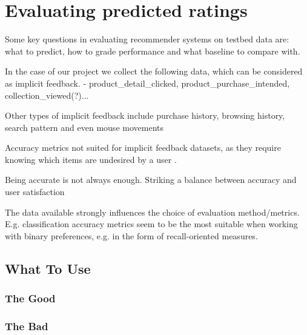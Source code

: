 
\section{Evaluating predicted ratings}





Some key questions in evaluating recommender systems on testbed data are: what
to predict, how to grade performance and what baseline to compare with.


In the case of our project we collect the following data, which can be
considered as implicit feedback.  - product\_detail\_clicked,
product\_purchase\_intended, collection\_viewed(?)...

Other types of implicit feedback include purchase history, browsing
history, search pattern and even mouse movements

Accuracy metrics not suited for implicit feedback datasets, as they require
knowing which items are undesired by a user \cite{Hu2008}.

Being accurate is not always enough. Striking a balance between accuracy and
user satisfaction \cite{McNee2006}

The data available strongly influences the choice of evaluation method/metrics.
E.g. classification accuracy metrics seem to be the most suitable when working
with binary preferences, e.g. in the form of recall-oriented measures.



\subsection{What To Use}


\subsubsection{The Good}


\subsubsection{The Bad}

